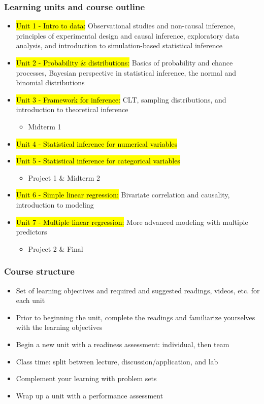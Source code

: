 \documentclass[slidestop,compress,mathserif,12pt,t,professionalfonts,xcolor=table]{beamer}
\begin{document}
\begin{frame}
\frametitle{Learning units and course outline}

{\footnotesize
\begin{itemize}[<+->]
\item \hl{Unit 1 - Intro to data:} Observational studies and non-causal inference, principles of experimental design and causal inference, exploratory data analysis, and introduction to simulation-based statistical inference
\item \hl{Unit 2 - Probability \& distributions:} Basics of probability and chance processes, Bayesian perspective in statistical inference, the normal and binomial distributions
\item \hl{Unit 3 - Framework for inference:} CLT, sampling distributions, and introduction to theoretical inference
\begin{itemize}
\item Midterm 1
\end{itemize}
\item \hl{Unit 4 - Statistical inference for numerical variables}
\item \hl{Unit 5 - Statistical inference for categorical variables}
\begin{itemize}
\item Project 1 \& Midterm 2
\end{itemize}
\item \hl{Unit 6 - Simple linear regression:} Bivariate correlation and causality, introduction to modeling
\item \hl{Unit 7 - Multiple linear regression:} More advanced modeling with multiple predictors
\begin{itemize}
\item Project 2 \& Final
\end{itemize}
\end{itemize}
}

\end{frame}


\begin{frame}
\frametitle{Course structure}

\begin{itemize}[<alert@+>]
\item Set of learning objectives and required and suggested readings, videos, etc. for each unit
\item Prior to beginning the unit, complete the readings and familiarize yourselves with the learning objectives
\item Begin a new unit with a readiness assessment: individual, then team 
\item Class time: split between lecture, discussion/application, and lab
\item Complement your learning with problem sets
\item Wrap up a unit with a performance assessment
\end{itemize}

\end{frame}
\end{document}
